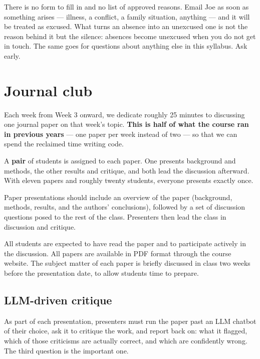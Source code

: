 \documentclass[11pt]{article}
\begin{document}
There is no form to fill in and no list of approved reasons. Email Joe as soon as something
arises --- illness, a conflict, a family situation, anything --- and it will be treated as
excused. What turns an absence into an unexcused one is not the reason behind it but the silence:
absences become unexcused when you do not get in touch. The same goes for questions about
anything else in this syllabus. Ask early.

\section{Journal club}

Each week from Week 3 onward, we dedicate roughly 25 minutes to discussing one journal paper on
that week's topic. \textbf{This is half of what the course ran in previous years} --- one paper
per week instead of two --- so that we can spend the reclaimed time writing code.

A \textbf{pair} of students is assigned to each paper. One presents background and methods, the
other results and critique, and both lead the discussion afterward. With eleven papers and
roughly twenty students, everyone presents exactly once.

Paper presentations should include an overview of the paper (background, methods, results, and
the authors' conclusions), followed by a set of discussion questions posed to the rest of the
class. Presenters then lead the class in discussion and critique.

All students are expected to have read the paper and to participate actively in the discussion.
All papers are available in PDF format through the course website. The subject matter of each
paper is briefly discussed in class two weeks before the presentation date, to allow students
time to prepare.

\subsection{LLM-driven critique}

As part of each presentation, presenters must run the paper past an LLM chatbot of their choice,
ask it to critique the work, and report back on: what it flagged, which of those criticisms are
actually correct, and which are confidently wrong. The third question is the important one.

\end{document}
